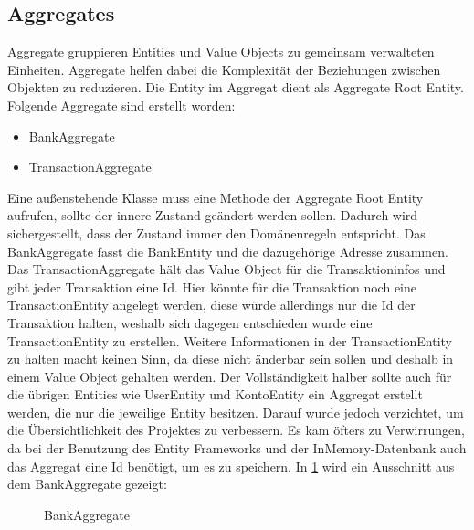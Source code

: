 \subsection{Aggregates}
Aggregate gruppieren Entities und Value Objects zu gemeinsam verwalteten Einheiten.
Aggregate helfen dabei die Komplexität der Beziehungen zwischen Objekten zu reduzieren. Die Entity im Aggregat dient als Aggregate Root Entity.
\newline Folgende Aggregate sind 
erstellt worden:
\begin{itemize}
    \item BankAggregate
    \item TransactionAggregate
\end{itemize}
Eine außenstehende Klasse muss eine Methode der Aggregate Root Entity aufrufen, sollte der innere Zustand geändert werden sollen. Dadurch wird sichergestellt, dass der Zustand immer den Domänenregeln entspricht.
\newline Das BankAggregate fasst die BankEntity und die dazugehörige Adresse zusammen. Das TransactionAggregate hält das Value Object 
für die Transaktioninfos und gibt jeder Transaktion eine Id. Hier könnte für die Transaktion noch eine TransactionEntity angelegt werden, diese würde allerdings nur die Id der Transaktion halten, weshalb sich dagegen entschieden wurde eine TransactionEntity zu erstellen. 
Weitere Informationen in der TransactionEntity zu halten macht keinen Sinn, da diese nicht änderbar sein sollen und deshalb in einem Value Object gehalten werden. Der Vollständigkeit halber sollte auch für die übrigen Entities wie UserEntity und KontoEntity ein Aggregat erstellt werden, die nur die jeweilige Entity besitzen. 
Darauf wurde jedoch verzichtet, um die Übersichtlichkeit des Projektes zu verbessern. Es kam öfters zu Verwirrungen, da bei der Benutzung des Entity Frameworks und der InMemory-Datenbank auch das Aggregat eine Id benötigt, um es zu speichern.
\newline In \ref{bankAgg} wird ein Ausschnitt aus dem BankAggregate gezeigt:
\begin{figure}[htbp]
    \centering
    \caption{\label{bankAgg} BankAggregate}
\end{figure}
